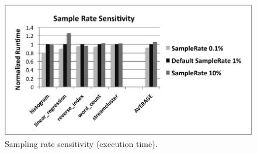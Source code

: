 \begin{figure}[!t]
\centering
\includegraphics[width=6in]{predator/figure/sample}
\caption{Sampling rate sensitivity (execution time).}
\label{fig:predatorsample}
\end{figure}


